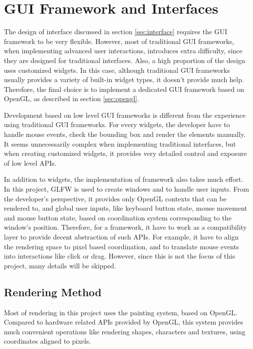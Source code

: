 \documentclass[msc,deptreport, cs]{infthesis}
\begin{document}
\section{GUI Framework and Interfaces}

The design of interface discussed in section \ref{sec:interface} requires the GUI framework to be very flexible. However, most of traditional GUI frameworks, when implementing advanced user interactions, introduces extra difficulty, since they are designed for traditional interfaces. Also, a high proportion of the design uses customized widgets. In this case, although traditional GUI frameworks usually provides a variety of built-in widget types, it doesn't provide much help. Therefore, the final choice is to implement a dedicated GUI framework based on OpenGL, as described in section \ref{sec:opengl}.

Development based on low level GUI frameworks is different from the experience using traditional GUI frameworks. For every widgets, the developer have to handle mouse events, check the bounding box and render the elements manually. It seems unnecessarily complex when implementing traditional interfaces, but when creating customized widgets, it provides very detailed control and exposure of low level APIs.

In addition to widgets, the implementation of framework also takes much effort. In this project, GLFW is used to create windows and to handle user inputs. From the developer's perspective, it provides only OpenGL contexts that can be rendered to, and global user inputs, like keyboard button state, mouse movement and mouse button state, based on coordination system corresponding to the window's position. Therefore, for a framework, it have to work as a compatibility layer to provide decent abstraction of such APIs. For example, it have to align the rendering space to pixel based coordination, and to translate mouse events into interactions like click or drag. However, since this is not the focus of this project, many details will be skipped.

\subsection{Rendering Method}

Most of rendering in this project uses the painting system, based on OpenGL. Compared to hardware related APIs provided by OpenGL, this system provides much convenient operations like rendering shapes, characters and textures, using coordinates aligned to pixels.
\end{document}
